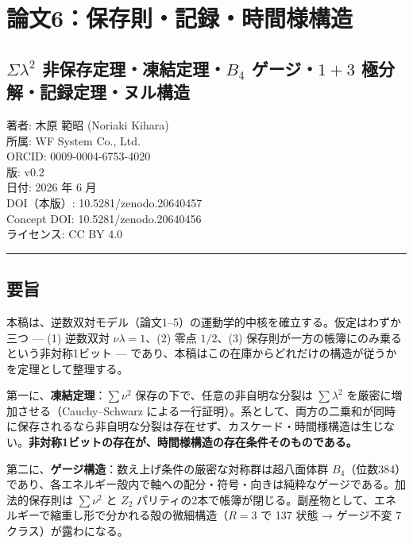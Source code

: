 \documentclass[
]{ltjsarticle}
\author{}
\date{}
\begin{document}
\section{論文6：保存則・記録・時間様構造}\label{ux8ad6ux65876ux4fddux5b58ux5247ux8a18ux9332ux6642ux9593ux69d8ux69cbux9020}

\subsection{\texorpdfstring{\(\Sigma\lambda^2\)
非保存定理・凍結定理・\(B_4\) ゲージ・\(1{+}3\)
極分解・記録定理・ヌル構造}{\textbackslash Sigma\textbackslash lambda\^{}2 非保存定理・凍結定理・B\_4 ゲージ・1\{+\}3 極分解・記録定理・ヌル構造}}\label{sigmalambda2-ux975eux4fddux5b58ux5b9aux7406ux51cdux7d50ux5b9aux7406b_4-ux30b2ux30fcux30b813-ux6975ux5206ux89e3ux8a18ux9332ux5b9aux7406ux30ccux30ebux69cbux9020}

著者: 木原 範昭 (Noriaki Kihara)\\
所属: WF System Co., Ltd.\\
ORCID: 0009-0004-6753-4020\\
版: v0.2\\
日付: 2026 年 6 月\\
DOI（本版）: 10.5281/zenodo.20640457\\
Concept DOI: 10.5281/zenodo.20640456\\
ライセンス: CC BY 4.0

\begin{center}\rule{0.5\linewidth}{0.5pt}\end{center}

\subsection{要旨}\label{ux8981ux65e8}

本稿は、逆数双対モデル（論文1--5）の運動学的中核を確立する。仮定はわずか三つ
--- (1) 逆数双対 \(\nu\lambda=1\)、(2) 零点 \(1/2\)、(3)
保存則が一方の帳簿にのみ乗るという非対称1ビット ---
であり、本稿はこの在庫からどれだけの構造が従うかを定理として整理する。

第一に、\textbf{凍結定理}：\(\sum\nu^2\)
保存の下で、任意の非自明な分裂は \(\sum\lambda^2\)
を厳密に増加させる（Cauchy--Schwarz
による一行証明）。系として、両方の二乗和が同時に保存されるなら非自明な分裂は存在せず、カスケード・時間様構造は生じない。\textbf{非対称1ビットの存在が、時間様構造の存在条件そのものである。}

第二に、\textbf{ゲージ構造}：数え上げ条件の厳密な対称群は超八面体群
\(B_4\)（位数384）であり、各エネルギー殻内で軸への配分・符号・向きは純粋なゲージである。加法的保存則は
\(\sum\nu^2\) と \(Z_2\)
パリティの2本で帳簿が閉じる。副産物として、エネルギーで縮重し形で分かれる殻の微細構造（\(R=3\)
で 137 状態 → ゲージ不変 7 クラス）が露わになる。
\end{document}
